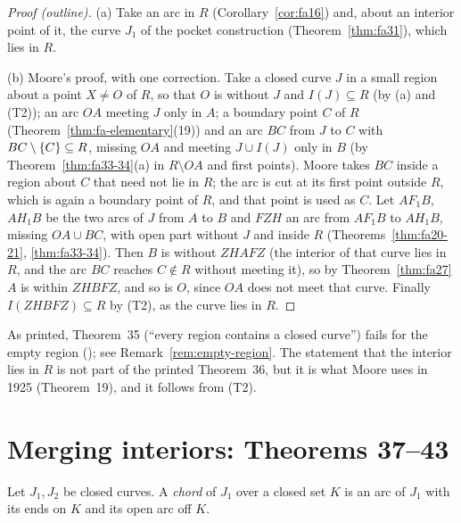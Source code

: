\begin{proof}[Proof (outline)]
(a) Take an arc in $R$ (Corollary~\ref{cor:fa16}) and, about an interior point of it, the curve $J_1$ of the pocket
construction (Theorem~\ref{thm:fa31}), which lies in $R$.

(b) Moore's proof, with one correction. Take a closed curve $J$ in a small region about a point $X\ne O$ of $R$, so that $O$ is
without $J$ and $I(J)\subseteq R$ (by (a) and (T2)); an arc $OA$ meeting $J$ only in $A$; a boundary point $C$ of $R$
(Theorem~\ref{thm:fa-elementary}(19)) and an arc $BC$ from $J$ to $C$ with $BC\setminus\left\{ C \right\}\subseteq R$, missing $OA$ and meeting $J\cup I(J)$
only in $B$ (by Theorem~\ref{thm:fa33-34}(a) in $R\setminus OA$ and first points). Moore takes $BC$ inside a region about $C$ that need
not lie in $R$; the arc is cut at its first point outside $R$, which is again a boundary point of $R$, and that point is used as $C$.
Let $AF_1B$, $AH_1B$ be the two arcs of $J$ from $A$ to $B$ and $FZH$ an arc from $AF_1B$ to $AH_1B$, missing $OA\cup BC$, with open part
without $J$ and inside $R$ (Theorems~\ref{thm:fa20-21}, \ref{thm:fa33-34}). Then $B$ is without $ZHAFZ$ (the interior of that curve lies
in $R$, and the arc $BC$ reaches $C\notin R$ without meeting it), so by Theorem~\ref{thm:fa27} $A$ is within $ZHBFZ$, and so is $O$, since
$OA$ does not meet that curve. Finally $I(ZHBFZ)\subseteq R$ by (T2), as the curve lies in $R$.
\end{proof}


\begin{remark}
As printed, Theorem~35 (``every region contains a closed curve'') fails for the empty region
(); see Remark~\ref{rem:empty-region}. The statement that the interior lies in $R$ is
not part of the printed Theorem~36, but it is what Moore uses in 1925 (Theorem~19), and it follows from (T2).
\end{remark}

\section{Merging interiors: Theorems 37--43}

\begin{definition}\label{def:chord}
Let $J_1,J_2$ be closed curves. A \emph{chord} of $J_1$ over a closed set $K$ is an arc of $J_1$ with its ends on $K$ and its open
arc off $K$.
\end{definition}

